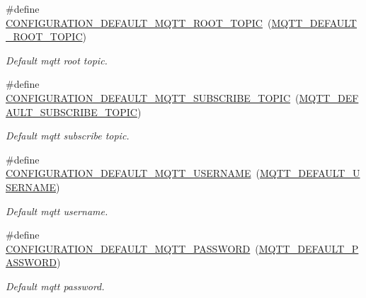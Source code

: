 \begin{DoxyCompactItemize}
\mbox{\label{rmap-config_8h_a85521de6b08f8704bd35a8e34edef4f8}} 
\#define \hyperlink{rmap-config_8h_a85521de6b08f8704bd35a8e34edef4f8}{C\+O\+N\+F\+I\+G\+U\+R\+A\+T\+I\+O\+N\+\_\+\+D\+E\+F\+A\+U\+L\+T\+\_\+\+M\+Q\+T\+T\+\_\+\+R\+O\+O\+T\+\_\+\+T\+O\+P\+IC}~(\hyperlink{mqtt__config_8h_a2b1941298e45ce3305da283122a525dc}{M\+Q\+T\+T\+\_\+\+D\+E\+F\+A\+U\+L\+T\+\_\+\+R\+O\+O\+T\+\_\+\+T\+O\+P\+IC})
\begin{DoxyCompactList}\small\item\em Default mqtt root topic. \end{DoxyCompactList}\item 
\mbox{\label{rmap-config_8h_ad5f5c2f91406f76021e58aaebb4fe84d}} 
\#define \hyperlink{rmap-config_8h_ad5f5c2f91406f76021e58aaebb4fe84d}{C\+O\+N\+F\+I\+G\+U\+R\+A\+T\+I\+O\+N\+\_\+\+D\+E\+F\+A\+U\+L\+T\+\_\+\+M\+Q\+T\+T\+\_\+\+S\+U\+B\+S\+C\+R\+I\+B\+E\+\_\+\+T\+O\+P\+IC}~(\hyperlink{mqtt__config_8h_a0cca2cd81b7401df39de182ed847bbdb}{M\+Q\+T\+T\+\_\+\+D\+E\+F\+A\+U\+L\+T\+\_\+\+S\+U\+B\+S\+C\+R\+I\+B\+E\+\_\+\+T\+O\+P\+IC})
\begin{DoxyCompactList}\small\item\em Default mqtt subscribe topic. \end{DoxyCompactList}\item 
\mbox{\label{rmap-config_8h_a4606b704d26885b00b68c8e7d1c4b77a}} 
\#define \hyperlink{rmap-config_8h_a4606b704d26885b00b68c8e7d1c4b77a}{C\+O\+N\+F\+I\+G\+U\+R\+A\+T\+I\+O\+N\+\_\+\+D\+E\+F\+A\+U\+L\+T\+\_\+\+M\+Q\+T\+T\+\_\+\+U\+S\+E\+R\+N\+A\+ME}~(\hyperlink{mqtt__config_8h_a67a711e15478d8d8ba7aa984947f1cd8}{M\+Q\+T\+T\+\_\+\+D\+E\+F\+A\+U\+L\+T\+\_\+\+U\+S\+E\+R\+N\+A\+ME})
\begin{DoxyCompactList}\small\item\em Default mqtt username. \end{DoxyCompactList}\item 
\mbox{\label{rmap-config_8h_a93f4ec08026dd0e8eaffc77a72986283}} 
\#define \hyperlink{rmap-config_8h_a93f4ec08026dd0e8eaffc77a72986283}{C\+O\+N\+F\+I\+G\+U\+R\+A\+T\+I\+O\+N\+\_\+\+D\+E\+F\+A\+U\+L\+T\+\_\+\+M\+Q\+T\+T\+\_\+\+P\+A\+S\+S\+W\+O\+RD}~(\hyperlink{mqtt__config_8h_a38f208acaf4f9f771cf7e707488f8c29}{M\+Q\+T\+T\+\_\+\+D\+E\+F\+A\+U\+L\+T\+\_\+\+P\+A\+S\+S\+W\+O\+RD})
\begin{DoxyCompactList}\small\item\em Default mqtt password. \end{DoxyCompactList}\item 

\end{DoxyCompactItemize}
